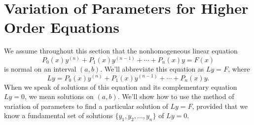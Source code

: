 \section{Variation of Parameters for Higher Order Equations}
\label{sec:higher_variation_param}


We assume throughout this section that the nonhomogeneous linear
equation
\begin{equation} \label{eq:9.4.1}
P_0(x)y^{(n)}+P_1(x)y^{(n-1)}+\cdots+P_n(x)y=F(x)
\end{equation}
is normal on an interval $(a,b)$. We'll abbreviate this equation as
$Ly=F$, where
\[
Ly=P_0(x)y^{(n)}+P_1(x)y^{(n-1)}+\cdots+P_n(x)y.
\]
When we speak of solutions of this equation and its complementary
equation $Ly=0$, we mean solutions on $(a,b)$. We'll show how to use
the method of variation of parameters to find a particular solution of
$Ly=F$, provided that we know a fundamental set of solutions
$\{y_1,y_2,\dots,y_n\}$ of $Ly=0$.


